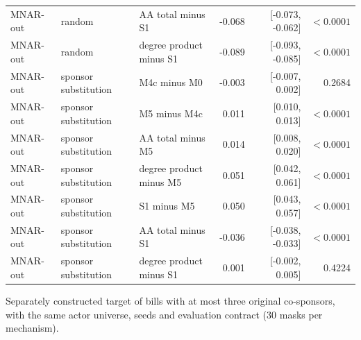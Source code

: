 \begin{table}[tbp]
\begin{tabular}{lllrrr}
MNAR-out & random & AA total minus S1 & -0.068 & [-0.073, -0.062] & $<0.0001$ \\
MNAR-out & random & degree product minus S1 & -0.089 & [-0.093, -0.085] & $<0.0001$ \\
MNAR-out & sponsor substitution & M4c minus M0 & -0.003 & [-0.007, 0.002] & 0.2684 \\
MNAR-out & sponsor substitution & M5 minus M4c & 0.011 & [0.010, 0.013] & $<0.0001$ \\
MNAR-out & sponsor substitution & AA total minus M5 & 0.014 & [0.008, 0.020] & $<0.0001$ \\
MNAR-out & sponsor substitution & degree product minus M5 & 0.051 & [0.042, 0.061] & $<0.0001$ \\
MNAR-out & sponsor substitution & S1 minus M5 & 0.050 & [0.043, 0.057] & $<0.0001$ \\
MNAR-out & sponsor substitution & AA total minus S1 & -0.036 & [-0.038, -0.033] & $<0.0001$ \\
MNAR-out & sponsor substitution & degree product minus S1 & 0.001 & [-0.002, 0.005] & 0.4224 \\
\bottomrule
\end{tabular}
\par\vspace{2pt}\footnotesize Separately constructed target of bills with at most three original co-sponsors, with the same actor universe, seeds and evaluation contract (30 masks per mechanism).
\end{table}